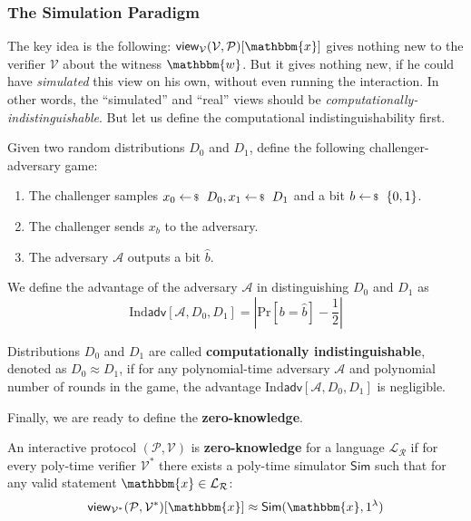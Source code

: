 \documentclass[../../book.tex]{subfiles}
\begin{document}
\subsubsection{The Simulation Paradigm}\label{subsection:simulation}

The key idea is the following: $\mathsf{view}_{\mathcal{V}}(\mathcal{V},
\mathcal{P})[\mathbbm{x}]$ gives nothing new to the verifier $\mathcal{V}$ about
the witness $\mathbbm{w}$. But it gives nothing new, if he could have
\textit{simulated} this view on his own, without even running the interaction.
In other words, the ``simulated'' and ``real'' views should be
\textit{computationally-indistinguishable}. But let us define the computational
indistinguishability first.

\begin{definition}
    Given two random distributions $D_0$ and $D_1$, define the following
    challenger-adversary game:
    \begin{enumerate}
        \item The challenger samples $x_0 \leftarrowS D_0, x_1 \leftarrowS D_1$
        and a bit $b \leftarrowS \{0,1\}$.
        \item The challenger sends $x_b$ to the adversary.
        \item The adversary $\mathcal{A}$ outputs a bit $\hat{b}$.
    \end{enumerate}

    We define the advantage of the adversary $\mathcal{A}$ in distinguishing $D_0$ and $D_1$ as 
    \begin{equation*}
        \text{Ind}\textsf{adv}[\mathcal{A}, D_0, D_1] = \left|\text{Pr}[b = \hat{b}] - \frac{1}{2}\right|
    \end{equation*}

    Distributions $D_0$ and $D_1$ are called \textbf{computationally
    indistinguishable}, denoted as $D_0 \approx D_1$, if for any polynomial-time
    adversary $\mathcal{A}$ and polynomial number of rounds in the game, the
    advantage $\text{Ind}\textsf{adv}[\mathcal{A}, D_0, D_1]$ is negligible.
\end{definition}

Finally, we are ready to define the \textbf{zero-knowledge}.

\begin{definition}
    An interactive protocol $(\mathcal{P}, \mathcal{V})$ is
    \textbf{zero-knowledge} for a language $\mathcal{L}_{\mathcal{R}}$ if for
    every poly-time verifier $\mathcal{V}^*$ there exists a poly-time simulator
    $\mathsf{Sim}$ such that for any valid statement $\mathbbm{x} \in
    \mathcal{L}_{\mathcal{R}}$:
    \begin{equation*}
        \mathsf{view}_{\mathcal{V}^*}(\mathcal{P}, \mathcal{V}^*)[\mathbbm{x}] \approx \mathsf{Sim}(\mathbbm{x}, 1^{\lambda})
    \end{equation*}
\end{definition}
\end{document}
